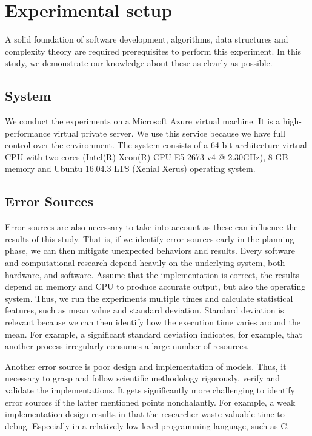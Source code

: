 \documentclass[a4paper,11pt]{kth-mag}
\newcommand*{\skippara}{\par\vspace{\baselineskip} \noindent}
\begin{document}
\section{Experimental setup}\label{sec:setup}
A solid foundation of software development, algorithms, data structures and complexity theory are required prerequisites to perform this experiment.
In this study, we demonstrate our knowledge about these as clearly as possible.

\subsection{System}
We conduct the experiments on a Microsoft Azure virtual machine.
It is a high-performance virtual private server.
We use this service because we have full control over the environment.
The system consists of a 64-bit architecture virtual CPU with two cores (Intel(R) Xeon(R) CPU E5-2673 v4 @ 2.30GHz), 8 GB memory and Ubuntu 16.04.3 LTS (Xenial Xerus) operating system.

\subsection{Error Sources}
Error sources are also necessary to take into account as these can influence the results of this study.
That is, if we identify error sources early in the planning phase, we can then mitigate unexpected behaviors and results.
Every software and computational research depend heavily on the underlying system, both hardware, and software.
Assume that the implementation is correct, the results depend on memory and CPU to produce accurate output, but also the operating system.
Thus, we run the experiments multiple times and calculate statistical features, such as mean value and standard deviation.
Standard deviation is relevant because we can then identify how the execution time varies around the mean.
For example, a significant standard deviation indicates, for example, that another process irregularly consumes a large number of resources.

\skippara Another error source is poor design and implementation of models.
Thus, it necessary to grasp and follow scientific methodology rigorously, verify and validate the implementations.
It gets significantly more challenging to identify error sources if the latter mentioned points nonchalantly.
For example, a weak implementation design results in that the researcher waste valuable time to debug.
Especially in a relatively low-level programming language, such as C.
\end{document}
